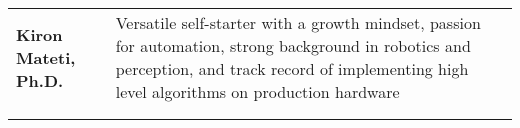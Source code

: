 \begin{tabular}{L{\lcolw} L{\rcolw}}
\textbf{\LARGE {Kiron Mateti, Ph.D.}} 
& {\large Versatile self-starter with a growth mindset, passion for automation, strong background in robotics and perception,  
and track record of implementing high level algorithms on production hardware} 
\\ 
\\
\hline \hline \\ 
\end{tabular}